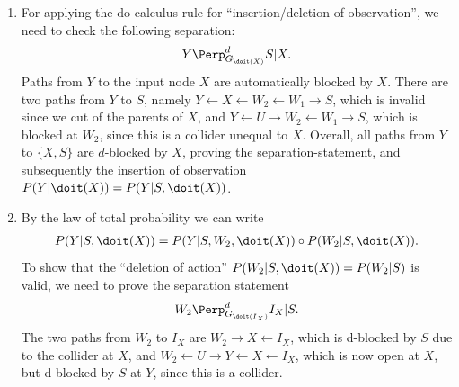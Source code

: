 \begin{enumerate}[label=8.\arabic*]
    \begin{gradedsolution}
        \begin{enumerate}
            \item {} For applying the do-calculus rule for ``insertion/deletion of observation'', we need to check the following separation:
            \begin{equation*}
                Y \Perp_{G_{\doit(X)}}^{d} S | X.
            \end{equation*}
            Paths from $Y$ to the input node $X$ are automatically blocked by $X$.
            There are two paths from $Y$ to $S$, namely $Y \leftarrow X \leftarrow W_2 \leftarrow W_1 \rightarrow S$, which is invalid since we cut of the parents of $X$, and $Y \leftarrow U \rightarrow W_2 \leftarrow W_1 \rightarrow S$, which is blocked at $W_2$, since this is a collider unequal to $X$.
            Overall, all paths from $Y$ to $\{X, S\}$ are $d$-blocked by $X$, proving the separation-statement, and subsequently the insertion of observation $P(Y | \doit(X)) = P(Y | S, \doit(X))$.
            \item {}
            By the law of total probability we can write
            \begin{align*}
                P(Y | S, \doit(X)) = P(Y | S, W_2, \doit(X)) \circ P(W_2 | S, \doit(X)).
            \end{align*}
            To show that the ``deletion of action'' $P(W_2 | S, \doit(X)) = P(W_2 | S)$ is valid, we need to prove the separation statement
            \begin{equation*}
                W_2 \Perp_{G_{\doit(I_X)}}^d I_X | S.
            \end{equation*}
            The two paths from $W_2$ to $I_X$ are $W_2 \rightarrow X \leftarrow I_X$, which is d-blocked by $S$ due to the collider at $X$, and $W_2 \leftarrow U \rightarrow Y \leftarrow X \leftarrow I_X$, which is now open at $X$, but d-blocked by $S$ at $Y$, since this is a collider.


\end{enumerate}
\end{gradedsolution}
\end{enumerate}
